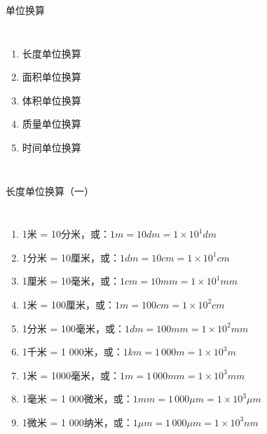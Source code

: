 \documentclass[aspectratio=169]{ctexbeamer} %
\date{\today}
\begin{document}
\begin{frame}[t]{单位换算}
\begin{columns}
\begin{enumerate}[label={\arabic*.}]
\item 长度单位换算
\item 面积单位换算
\item 体积单位换算
\item 质量单位换算
\item 时间单位换算
\end{enumerate}
\end{columns}
\end{frame}

\begin{frame}[t]{长度单位换算（一）}
\begin{columns}
\begin{enumerate}[label={\Alph*.}]
\item 1米 = 10分米，或：$1 m = 10 dm = 1 \times 10^1 dm$ 
\item 1分米 = 10厘米，或：$1 dm = 10 cm = 1 \times 10^1 cm$ 
\item 1厘米 = 10毫米，或：$1 cm = 10 mm = 1 \times 10^1 mm$ 
\item 1米 = 100厘米，或：$1 m = 100 cm = 1 \times 10^2 cm$ 
\item 1分米 = 100毫米，或：$1 dm = 100 mm = 1 \times 10^2 mm$ 
\item 1千米 = 1 000米，或：$1 km = 1 \, 000 m = 1 \times 10^3 m$ 
\item 1米 = 1000毫米，或：$1 m = 1 \, 000 mm = 1 \times 10^3 mm$ 
\item 1毫米 = 1 000微米，或：$1 mm = 1 \, 000 \mu m = 1 \times 10^3 \mu m$ 
\item 1微米 = 1 000纳米，或：$1 \mu m = 1 \, 000 \mu m = 1 \times 10^3 nm$ 
\end{enumerate}
\end{columns}
\end{frame}
\end{document}
